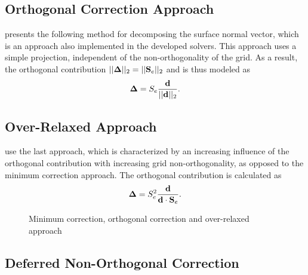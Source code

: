 \subsection{Orthogonal Correction Approach}
\label{seq:orthcorrapproach}

\cite{ferziger02} presents the following method for decomposing the surface normal vector, which is an approach also implemented in the developed solvers. This approach uses a simple projection, independent of the non-orthogonality of the grid. As a result, the orthogonal contribution \(||\boldsymbol{\Delta}||_2 =  ||\mathbf{S}_e||_2\) and is thus modeled as 
\begin{displaymath}
  \boldsymbol{\Delta} =  S_e \frac{\mathbf{d}}{ ||\mathbf{d}||_2}.
\end{displaymath}

\subsection{Over-Relaxed Approach}

\cite{jasak96,darwish09} use the last approach, which is characterized by an increasing influence of the orthogonal contribution with increasing grid non-orthogonality, as opposed to the minimum correction approach. The orthogonal contribution is calculated as
\begin{displaymath}
  \boldsymbol{\Delta} =  S_e^2 \frac{\mathbf{d}}{ \mathbf{d} \cdot \mathbf{S}_e }.
\end{displaymath} 

\begin{figure}[h]
\hfil
{}
\hfil
{}
\caption{Minimum correction, orthogonal correction and over-relaxed approach}
\label{fig:nonorth}
\end{figure}

\subsection{Deferred Non-Orthogonal Correction}

